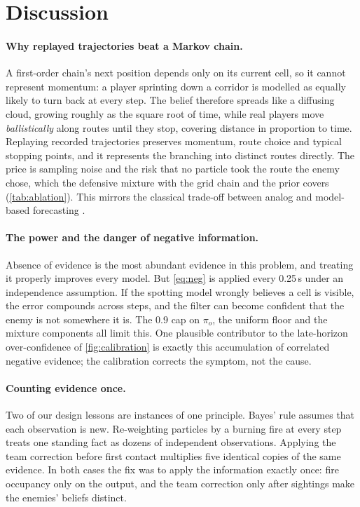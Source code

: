 \documentclass[11pt]{article}
\newcommand{\1}{\mathbb{1}}
\begin{document}
\section{Discussion}
\label{sec:discussion}

\paragraph{Why replayed trajectories beat a Markov chain.} A first-order chain's next position depends only on its current cell, so it cannot represent momentum: a player sprinting down a corridor is modelled as equally likely to turn back at every step. The belief therefore spreads like a diffusing cloud, growing roughly as the square root of time, while real players move \emph{ballistically} along routes until they stop, covering distance in proportion to time. Replaying recorded trajectories preserves momentum, route choice and typical stopping points, and it represents the branching into distinct routes directly. The price is sampling noise and the risk that no particle took the route the enemy chose, which the defensive mixture with the grid chain and the prior covers (\cref{tab:ablation}). This mirrors the classical trade-off between analog and model-based forecasting \citep{lorenz1969atmospheric}.

\paragraph{The power and the danger of negative information.} Absence of evidence is the most abundant evidence in this problem, and treating it properly improves every model. But \cref{eq:neg} is applied every 0.25\,s under an independence assumption. If the spotting model wrongly believes a cell is visible, the error compounds across steps, and the filter can become confident that the enemy is not somewhere it is. The 0.9 cap on $\pi_o$, the uniform floor and the mixture components all limit this. One plausible contributor to the late-horizon over-confidence of \cref{fig:calibration} is exactly this accumulation of correlated negative evidence; the calibration corrects the symptom, not the cause.

\paragraph{Counting evidence once.} Two of our design lessons are instances of one principle. Bayes' rule assumes that each observation is new. Re-weighting particles by a burning fire at every step treats one standing fact as dozens of independent observations. Applying the team correction before first contact multiplies five identical copies of the same evidence. In both cases the fix was to apply the information exactly once: fire occupancy only on the output, and the team correction only after sightings make the enemies' beliefs distinct.
\end{document}
